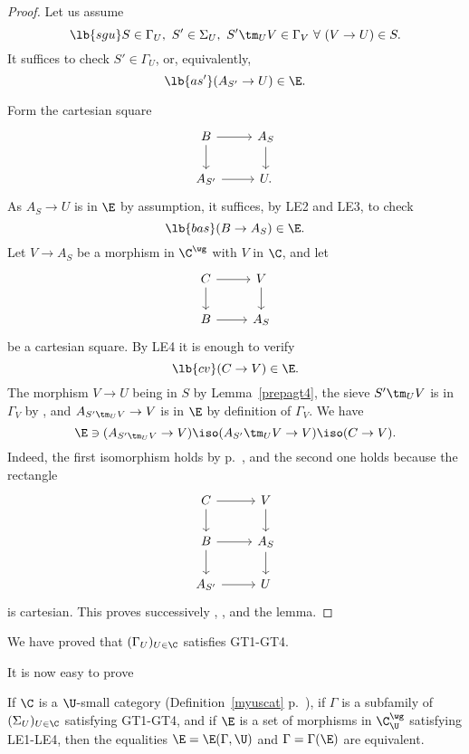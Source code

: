 \documentclass[12pt]{article}
\theoremstyle{remark}
\theoremstyle{definition}
\begin{document}
\begin{proof} 
Let us assume 
\begin{equation}\lb{sgu}
S\in\Gamma_U,\ S'\in\Sigma_U,\ S'\tm_UV\in\Gamma_V\ \forall\ (V\to U)\in S.
\end{equation}
It suffices to check $S'\in\Gamma_U$, or, equivalently, 
\begin{equation}\lb{as'}
(A_{S'}\to U)\in\E.
\end{equation}

Form the cartesian square 
$$
\begin{tikzcd}
B\ar{r}\ar{d}&A_S\ar{d}\\ 
A_{S'}\ar{r}&U.
\end{tikzcd}
$$ 
As $A_S\to U$ is in $\E$ by assumption, it suffices, by LE2 and LE3, to check 
\begin{equation}\lb{bas}
(B\to A_S)\in\E.
\end{equation} 
Let $V\to A_S$ be a morphism in $\C^\wg$ with $V$ in $\C$, and let 
$$
\begin{tikzcd}
C\ar{r}\ar{d}&V\ar{d}\\ 
B\ar{r}&A_S
\end{tikzcd}
$$ 
be a cartesian square. By LE4 it is enough to verify 
\begin{equation}\lb{cv}
(C\to V)\in\E.
\end{equation} 
The morphism $V\to U$ being in $S$ by Lemma~\ref{prepagt4}, the sieve $S'\tm_UV$ is in $\Gamma_V$ by , and $A_{S'\tm_UV}\to V$ is in $\E$ by definition of $\Gamma_V$. We have 
$$
\E\ni(A_{S'\tm_UV}\to V)\iso(A_{S'}\tm_UV\to V)\iso(C\to V).
$$ 
Indeed, the first isomorphism holds by  p.~, and the second one holds because the rectangle 
$$
\begin{tikzcd}
C\ar{r}\ar{d}&V\ar{d}\\ 
B\ar{r}\ar{d}&A_S\ar{d}\\ 
A_{S'}\ar{r}&U
\end{tikzcd}
$$ 
is cartesian. This proves successively , ,  and the lemma.  
\end{proof}

We have proved that $(\Gamma_U)_{U\in\C}$ satisfies GT1-GT4. 

It is now easy to prove 

\begin{thm}
If $\C$ is a $\U$-small category (Definition~\ref{myuscat} p.~), if $\Gamma$ is a subfamily of $(\Sigma_U)_{U\in\C}$ satisfying GT1-GT4, and if $\E$ is a set of morphisms in $\C^\wg_\U$ satisfying LE1-LE4, then the equalities $\E=\E(\Gamma,\U)$ and $\Gamma=\Gamma(\E)$ are equivalent.
\end{thm}
\end{document}
